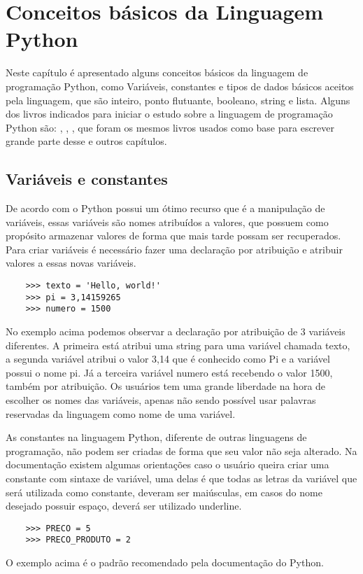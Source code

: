 

\chapter{ Conceitos básicos da Linguagem Python}

Neste capítulo é apresentado alguns conceitos básicos da linguagem de programação Python, como Variáveis, constantes e tipos de dados básicos aceitos pela linguagem, que são inteiro, ponto flutuante, booleano, string e lista. Alguns dos livros indicados para iniciar o estudo sobre a linguagem de programação Python são:  \cite{Lutz2007}, \cite{Perkovic2016}, \cite{Severance2016}, que foram os mesmos livros usados como base para escrever grande parte desse e outros capítulos.

    \section{Variáveis e constantes}
	De acordo com \cite{Severance2016} o Python possui um ótimo recurso que é a manipulação de variáveis, essas variáveis são nomes atribuídos a valores, que possuem como propósito armazenar valores de forma que mais tarde possam ser recuperados. 
	Para criar variáveis é necessário fazer uma declaração por atribuição e atribuir valores a essas novas variáveis. 
	\begin{lstlisting}
	>>> texto = 'Hello, world!'
	>>> pi = 3,14159265
	>>> numero = 1500
	\end{lstlisting}
	No exemplo acima podemos observar a declaração por atribuição de 3 variáveis diferentes. A primeira está atribui uma string para uma variável chamada texto, a segunda variável atribui o valor 3,14 que é conhecido como Pi e a variável possui o nome pi. Já a terceira variável numero está recebendo o valor 1500, também por atribuição. Os usuários tem uma grande liberdade na hora de escolher os nomes das variáveis, apenas não sendo possível usar palavras reservadas da linguagem como nome de uma variável.
	
	As constantes na linguagem Python, diferente de outras linguagens de programação, não podem ser criadas de forma que seu valor não seja alterado. Na documentação existem algumas orientações caso o usuário queira criar uma constante com sintaxe de variável, uma delas é que todas as letras da variável que será utilizada como constante, deveram ser maiúsculas, em casos do nome desejado possuir espaço, deverá ser utilizado underline.
	\begin{lstlisting}
	>>> PRECO = 5
	>>> PRECO_PRODUTO = 2
	\end{lstlisting}
	O exemplo acima é o padrão recomendado pela documentação do Python.

